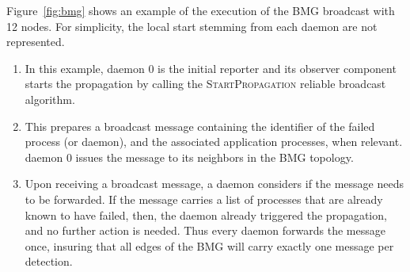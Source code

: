 \documentclass[sigconf]{acmart}
\begin{document}
Figure~\ref{fig:bmg} shows an example of the execution of the BMG broadcast 
with 12 nodes. For simplicity, the local start stemming from each daemon are not 
represented. 

\begin{enumerate}
 \item In this example, daemon 0 is the initial reporter and its observer component starts the propagation by calling the \textsc{StartPropagation} reliable broadcast algorithm.
 \item This prepares a broadcast message containing the identifier of the
 failed process (or daemon), and the associated application processes, when relevant. 
 daemon 0 issues the message to its neighbors in the BMG topology.
 \item Upon receiving a broadcast message, a daemon considers if the message needs 
 to be forwarded. If the message carries a list of processes that are already known to
 have failed, then, the daemon already triggered the propagation, and no further 
 action is needed. Thus every daemon forwards the message once, insuring that 
 all edges of the BMG will carry exactly one message per detection. 
\end{enumerate}
\end{document}

